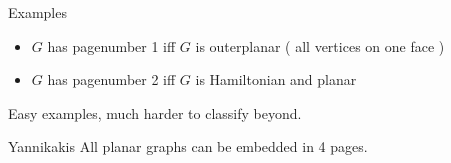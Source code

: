 \documentclass[]{beamer}
\begin{document}
\begin{frame}{Examples}
	\begin{itemize}
		\item $G$ has pagenumber 1 iff $G$ is outerplanar ( all vertices on one face )
		\item $G$ has pagenumber 2 iff $G$ is Hamiltonian and planar
	\end{itemize}
	Easy examples, much harder to classify beyond.
\end{frame}

\begin{frame}
	Yannikakis 
	All planar graphs can be embedded in 4 pages.
\end{frame}


\end{document}
